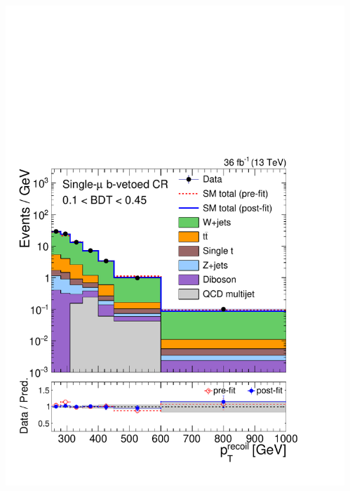 \documentclass[aspectratio=169,xcolor=dvipsnames,,table,compress]{beamer}
\begin{document}
\begin{frame}[t]
\begin{columns}[T]
\begin{column}{0.125\textwidth}
      \includegraphics[width=\textwidth]{../figures/monotop/postfit/stackedPostfit_singlemuonw_monotop_loose.pdf}
    \end{column}
    \begin{column}{0.125\textwidth}

\end{column}
\end{columns}
\end{frame}
\end{document}
